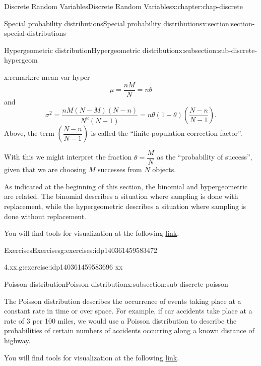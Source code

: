 \documentclass[oneside,10pt,]{book}
\numberwithin{equation}{section}
\begin{document}
\begin{chapterptx}{Discrete Random Variables}{}{Discrete Random Variables}{}{}{x:chapter:chap-discrete}
\begin{sectionptx}{Special probability distributions}{}{Special probability distributions}{}{}{x:section:section-special-distributions}
\begin{subsectionptx}{Hypergeometric distribution}{}{Hypergeometric distribution}{}{}{x:subsection:sub-discrete-hypergeom}
\begin{remark}{}{x:remark:re-mean-var-hyper}
\begin{equation*}
\mu =
\frac{nM}{N} = n\theta
\end{equation*}
and%
\begin{equation*}
\sigma^2 =
\frac{nM(N-M)(N-n)}{N^2(N-1)} =
n\theta(1-\theta)\left(\dfrac{N-n}{N-1}\right)\text{.}
\end{equation*}
Above, the term \(\left(\dfrac{N-n}{N-1}\right)\) is called the ``finite population correction factor''.%
\par
With this we might interpret the fraction \(\theta = \dfrac{M}{N}\) as the ``probability of success'', given that we are choosing \(M\) successes from \(N\) objects.%
\end{remark}
As indicated at the beginning of this section, the binomial and hypergeometric are related. The binomial describes a situation where sampling is done with replacement, while the hypergeometric describes a situation where sampling is done without replacement.%
\par
You will find tools for visualization at the following \href{https://buddy.uco.edu/shiny/slaverty/mathstat/HyperBin/}{link}.%
\end{subsectionptx}
%
%
\typeout{************************************************}
\typeout{************************************************}
%
\begin{exercises-subsection}{Exercises}{}{Exercises}{}{}{g:exercises:idp140361459583472}
\begin{divisionexercise}{1}{4.xx.}{}{g:exercise:idp140361459583696}%
xx%
\end{divisionexercise}%
\end{exercises-subsection}
%
%
\typeout{************************************************}
\typeout{************************************************}
%
\begin{subsectionptx}{Poisson distribution}{}{Poisson distribution}{}{}{x:subsection:sub-discrete-poisson}
\begin{introduction}{}%
The Poisson distribution describes the occurrence of events taking place at a constant rate in time or over space.  For example, if car accidents take place at a rate of 3 per 100 miles, we would use a Poisson distribution to describe the probabilities of certain numbers of accidents occurring along a known distance of highway.%
\par
You will find tools for visualization at the following \href{https://buddy.uco.edu/shiny/slaverty/mathstat/Poisson/}{link}.%

\end{introduction}
\end{subsectionptx}
\end{sectionptx}
\end{chapterptx}
\end{document}
